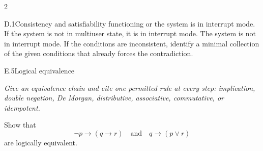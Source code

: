 \documentclass[9pt]{extarticle}
\begin{document}
\begin{multicols}{2}
\begin{CoreProblem}{D.1}{Consistency and satisfiability}
functioning or the system is in interrupt mode. If the system is not in
multiuser state, it is in interrupt mode. The system is not in interrupt mode.
If the conditions are inconsistent, identify a minimal collection of the given
conditions that already forces the contradiction.
\end{CoreProblem}
\begin{CoreProblem}{E.5}{Logical equivalence}
{\scriptsize\textit{Give an equivalence chain and cite one permitted rule at every step: implication, double negation, De Morgan, distributive, associative, commutative, or idempotent.}\par}
Show that
\[
  \neg p\to(q\to r)
  \quad\text{and}\quad
  q\to(p\lor r)
\]
are logically equivalent.
\end{CoreProblem}
\end{multicols}
\CoreWorkArea
\FormBreak
{}
\end{document}
